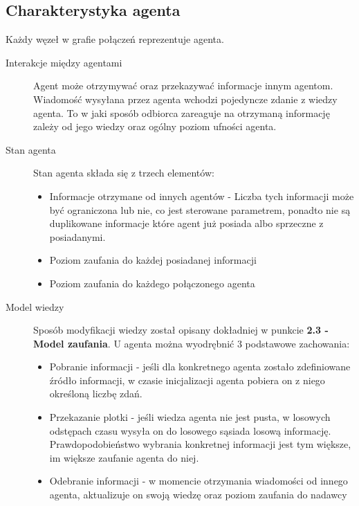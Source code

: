 \documentclass{article}
\begin{document}
	\subsection{Charakterystyka agenta}
	Każdy węzeł w grafie połączeń reprezentuje agenta.
	\begin{description}
		\item[Interakcje między agentami]
		Agent może otrzymywać oraz przekazywać informacje innym agentom. Wiadomość wysyłana przez agenta wchodzi pojedyncze zdanie z wiedzy agenta. To w jaki sposób odbiorca zareaguje na otrzymaną informację zależy od jego wiedzy oraz ogólny poziom ufności agenta. 
		\item[Stan agenta]
		Stan agenta składa się z trzech elementów:
		\begin{itemize}
			\item {Informacje otrzymane od innych agentów - 
			Liczba tych informacji może być ograniczona lub nie, co jest sterowane parametrem,
			ponadto nie są duplikowane informacje które agent już posiada albo sprzeczne z posiadanymi.}
			\item {Poziom zaufania do każdej posiadanej informacji}
			\item {Poziom zaufania do każdego połączonego agenta}
		\end{itemize}	
		\item[Model wiedzy]
	 Sposób modyfikacji wiedzy został opisany dokładniej w punkcie \textbf{2.3 - Model zaufania}. U agenta można wyodrębnić 3 podstawowe zachowania:
	 	\begin{itemize}
	 		\item{Pobranie informacji - jeśli dla konkretnego agenta zostało zdefiniowane źródło informacji, w czasie inicjalizacji agenta pobiera on z niego określoną liczbę zdań.}
	 		\item{Przekazanie plotki - jeśli wiedza agenta nie jest pusta, w losowych odstępach czasu wysyła on do losowego sąsiada losową informację. Prawdopodobieństwo wybrania konkretnej informacji jest tym większe, im większe zaufanie agenta do niej.}
	 		\item{Odebranie informacji - w momencie otrzymania wiadomości od innego agenta, aktualizuje on swoją wiedzę oraz poziom zaufania do nadawcy}
		\end{itemize}
	\end{description}
\end{document}
